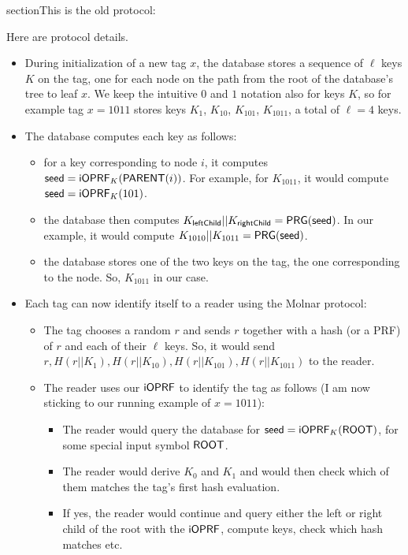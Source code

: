 \documentclass{article}
\begin{document}
\newpage
section{This is the old protocol:}

Here are protocol details.
\begin{itemize}

\item During initialization of a new tag $x$, the database stores a
  sequence of $\ell$ keys $K$ on the tag, one for each node on the path from
  the root of the database's tree to leaf $x$. We keep the intuitive $0$
  and $1$ notation also for keys $K$, so for example tag $x = 1011$ stores
  keys $K_1$, $K_{10}$, $K_{101}$, $K_{1011}$, a total of $\ell=4$ keys.

\item The database computes each key as follows:  
\begin{itemize}
\item for a key corresponding to node $i$, it computes $\mathsf{seed} =
  \mathsf{i}\mathsf{OPRF}_K(\mathsf{PARENT}(i))$. For example, for $K_{1011}$, it would
  compute $\mathsf{seed} = \mathsf{i}\mathsf{OPRF}_K(101)$.

\item the database then computes
  $K_{\mathsf{leftChild}}||K_{\mathsf{rightChild}} = \mathsf{PRG}(\mathsf{seed})$. In
  our example, it would compute $K_{1010}||K_{1011} = \mathsf{PRG}(\mathsf{seed})$.

\item the database stores one of the two keys on the tag, the one corresponding to the node. So, $K_{1011}$ in our case.
\end{itemize}

\item Each tag can now identify itself to a reader using the Molnar protocol:

  \begin{itemize}
\item The tag chooses a random $r$ and sends $r$ together with a hash (or a PRF) of $r$ and each of their $\ell$ keys. So, it would send $r, H(r||K_1), H(r||K_{10}), H(r||K_{101}), H(r||K_{1011})$ to the reader.

\item The reader uses our $\mathsf{i}\mathsf{OPRF}$ to identify the tag as follows (I am now sticking to our running example of $x=1011$):
  \begin{itemize}
    
\item The reader would query the database for $\mathsf{seed} =
  \mathsf{i}\mathsf{OPRF}_K(\mathsf{ROOT})$, for some special input symbol $\mathsf{ROOT}$.

\item The reader would derive $K_0$ and $K_1$ and would then check which of them matches the tag's first hash evaluation. 

\item If yes, the reader would continue and query either the left or right child of the root with the $\mathsf{i}\mathsf{OPRF}$, compute keys, check which hash matches etc.
\end{itemize}
  \end{itemize}
\end{itemize}
\end{document}
